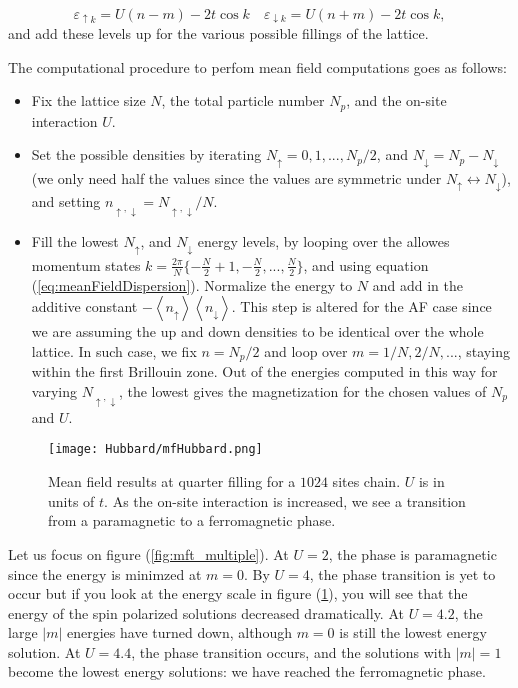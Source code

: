 \begin{equation}\label{eq:meanFieldDispersion}
\varepsilon_{\uparrow k} = U ( n - m ) - 2 t \cos k \quad \varepsilon_{\downarrow k} = U ( n + m ) - 2 t \cos k ,
\end{equation}
and add these levels up for the various possible fillings of the lattice.

The computational procedure to perfom mean field computations goes as follows:
\begin{itemize}
\item Fix the lattice size $N$, the total particle number $N_p$, and the on-site interaction $U$.
\item Set the possible densities by iterating $N_\uparrow = 0, 1, ..., N_p / 2$, and $N_\downarrow = N_p - N_\downarrow$ (we only need half the values since the values are symmetric under $ N_\uparrow \leftrightarrow N_\downarrow$), and setting $n_{\uparrow, \downarrow} = N_{\uparrow, \downarrow} / N$.
\item Fill the lowest $N_\uparrow$, and $N_\downarrow$ energy levels, by looping over the allowes momentum states $k = \frac{2\pi}{N} \{ -\frac{N}{2} + 1, -\frac{N}{2}, ..., \frac{N}{2} \}$, and using equation (\ref{eq:meanFieldDispersion}).
Normalize the energy to $N$ and add in the additive constant $- \left\langle n_\uparrow \right\rangle \left\langle n_\downarrow \right\rangle$.
This step is altered for the \acs{AF} case since we are assuming the up and down densities to be identical over the whole lattice.
In such case, we fix $n = N_p / 2$ and loop over $m = 1/ N, 2 / N,...$, staying within the first Brillouin zone.
Out of the energies computed in this way for varying $N_{\uparrow, \downarrow}$, the lowest gives the magnetization for the chosen values of $N_p$ and $U$.
\end{itemize}

\begin{figure}[H]
	\centering
\hspace{12mm}\texttt{[image: Hubbard/mfHubbard.png]}
	\caption[Mean field results for the \acs{1D} Hubbard model.]{Mean field results at quarter filling for a $ 1024$ sites chain.
	$U$ is in units of $t$.
	As the on-site interaction is increased, we see a transition from a paramagnetic to a ferromagnetic phase.}
	\label{fig:mft}
\end{figure}

Let us focus on figure (\ref{fig:mft_multiple}).
At $U = 2$, the phase is paramagnetic since the energy is minimzed at $m = 0$. By $U = 4$, the phase transition is yet to occur but if you look at the energy scale in figure (\ref{fig:mft}), you will see that the energy of the spin polarized solutions decreased dramatically.
	At $U = 4.2$, the large $| m | $ energies have turned down, although $m = 0$ is still the lowest energy solution.
	At $U = 4.4$, the phase transition occurs, and the solutions with $| m | = 1$ become the lowest energy solutions: we have reached the ferromagnetic phase.

